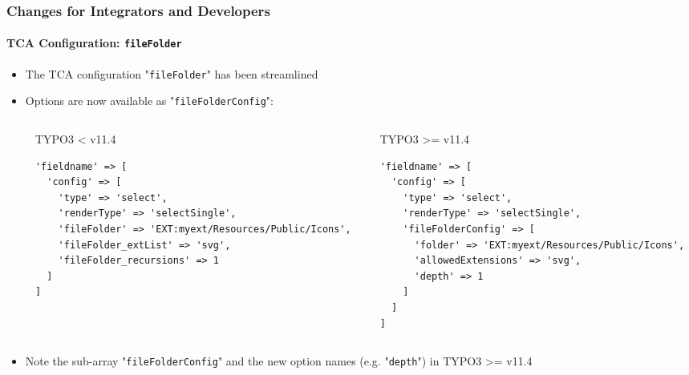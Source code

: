 %

\begin{frame}[fragile]
	\frametitle{Changes for Integrators and Developers}
	\framesubtitle{TCA Configuration: \texttt{fileFolder}}


	\begin{itemize}
		\item The TCA configuration "\texttt{fileFolder}" has been streamlined
		\item Options are now available as "\texttt{fileFolderConfig}":
	\end{itemize}

	\begin{columns}[T]
		\begin{column}{.04\textwidth}
		\end{column}
		\begin{column}{.48\textwidth}
			\smaller TYPO3 < v11.4 \normalsize
\begin{lstlisting}
'fieldname' => [
  'config' => [
    'type' => 'select',
    'renderType' => 'selectSingle',
    'fileFolder' => 'EXT:myext/Resources/Public/Icons',
    'fileFolder_extList' => 'svg',
    'fileFolder_recursions' => 1
  ]
]
\end{lstlisting}
		\end{column}
		\begin{column}{.48\textwidth}
			\smaller TYPO3 >= v11.4 \normalsize
\begin{lstlisting}
'fieldname' => [
  'config' => [
    'type' => 'select',
    'renderType' => 'selectSingle',
    'fileFolderConfig' => [
      'folder' => 'EXT:myext/Resources/Public/Icons',
      'allowedExtensions' => 'svg',
      'depth' => 1
    ]
  ]
]
\end{lstlisting}
		\end{column}
	\end{columns}

	\begin{itemize}
		\item Note the sub-array "\texttt{fileFolderConfig}" and the new option
			names (e.g. "\texttt{depth}") in TYPO3 >= v11.4
	\end{itemize}

\end{frame}

